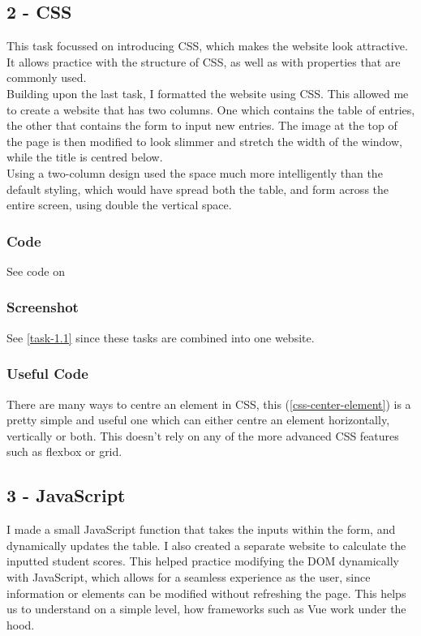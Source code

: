 \documentclass[portfolio.tex]{subfiles}
\begin{document}
			\subsection{2 - CSS}
				This task focussed on introducing CSS, which makes the website look attractive. It allows practice with the structure of CSS, as well as with properties that are commonly used.\\

				Building upon the last task, I formatted the website using CSS. This allowed me to create a  website that has two columns. One which contains the table of entries, the other that contains the form to input new entries. The image at the top of the page is then modified to look slimmer and stretch the width of the window, while the title is centred below. \\

				Using a two-column design used the space much more intelligently than the default styling, which would have spread both the table, and form across the entire screen, using double the vertical space.\\

				\subsubsection{Code}
				See code on 


				\subsubsection{Screenshot}
					See \ref{task-1.1} since these tasks are combined into one website.\\

				\subsubsection{Useful Code}
					There are many ways to centre an element in CSS, this (\ref{css-center-element}) is a pretty simple and useful one which can either centre an element horizontally, vertically or both. This doesn't rely on any of the more advanced CSS features such as flexbox or grid.\\

			\subsection{3 - JavaScript}
				I made a small JavaScript function that takes the inputs within the form, and dynamically updates the table. I also created a separate website to calculate the inputted student scores. This helped practice modifying the DOM dynamically with JavaScript, which allows for a seamless experience as the user, since information or elements can be modified without refreshing the page. This helps us to understand on a simple level, how frameworks such as Vue work under the hood. \\
\end{document}
